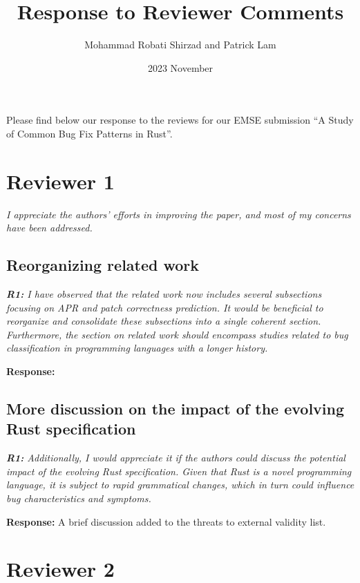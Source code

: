 \documentclass{article}
\title{Response to Reviewer Comments}
\date{2023 November}
\author{Mohammad Robati Shirzad and Patrick Lam}
\begin{document}
\maketitle

Please find below our response to the reviews for our EMSE submission ``A Study of Common Bug Fix Patterns in Rust''.

\section{Reviewer 1}

\textit{I appreciate the authors' efforts in improving the paper, and most of my concerns have been addressed.}

\subsection{Reorganizing related work}

\textit{\textbf{R1:} I have observed that the related work now includes several subsections focusing on APR and patch correctness prediction. It would be beneficial to reorganize and consolidate these subsections into a single coherent section. Furthermore, the section on related work should encompass studies related to bug classification in programming languages with a longer history.}

\vspace*{1em} \noindent \textbf{Response:} 

\subsection{More discussion on the impact of the evolving Rust specification}

\textit{\textbf{R1:} Additionally, I would appreciate it if the authors could discuss the potential impact of the evolving Rust specification. Given that Rust is a novel programming language, it is subject to rapid grammatical changes, which in turn could influence bug characteristics and symptoms.}

\vspace*{1em} \noindent \textbf{Response:} A brief discussion added to the threats to external validity list.

\section{Reviewer 2}
\end{document}
